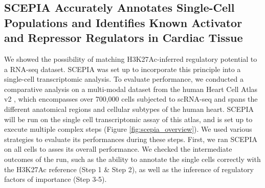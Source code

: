 \subsection{SCEPIA Accurately Annotates Single-Cell Populations and Identifies Known Activator and Repressor Regulators in Cardiac Tissue}

We showed the possibility of matching H3K27Ac-inferred regulatory potential to a RNA-seq dataset. SCEPIA was set up to incorporate this principle into a single-cell transcriptomic analysis. To evaluate performance, we conducted a comparative analysis on a multi-modal dataset from the human Heart Cell Atlas v2 \cite{Kanemaru2023}, which encompasses over 700,000 cells subjected to scRNA-seq and spans the different anatomical regions and cellular subtypes of the human heart. SCEPIA will be run on the single cell transcriptomic assay of this atlas, and is set up to execute multiple complex steps (Figure \ref{fig:scepia_overview}). We used various strategies to evaluate its performances during these steps. First, we ran SCEPIA on all cells to asses its overall performance. We checked the intermediate outcomes of the run, such as the ability to annotate the single cells correctly with the H3K27Ac reference (Step 1 \& Step 2), as well as the inference of regulatory factors of importance (Step 3-5). 

